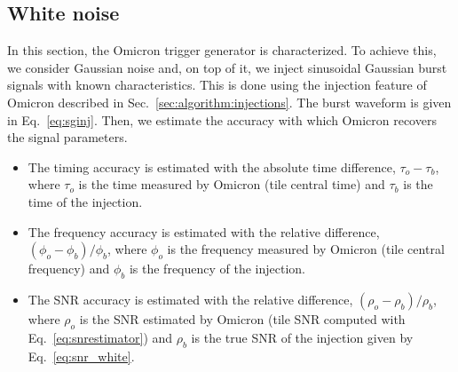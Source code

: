 \subsection{White noise} \label{sec:characterization:white}
In this section, the Omicron trigger generator is characterized. To achieve this, we consider Gaussian noise and, on top of it, we inject sinusoidal Gaussian burst signals with known characteristics. This is done using the injection feature of Omicron described in Sec.~\ref{sec:algorithm:injections}. The burst waveform is given in Eq.~\ref{eq:sginj}. Then, we estimate the accuracy with which Omicron recovers the signal parameters.
\begin{itemize}
\item The timing accuracy is estimated with the absolute time difference, $\tau_o-\tau_b$, where $\tau_o$ is the time measured by Omicron (tile central time) and $\tau_b$ is the time of the injection.
\item The frequency accuracy is estimated with the relative difference, $(\phi_o-\phi_b)/\phi_b$, where $\phi_o$ is the frequency measured by Omicron (tile central frequency) and $\phi_b$ is the frequency of the injection.
\item The SNR accuracy is estimated with the relative difference, $(\rho_o-\rho_b)/\rho_b$, where $\rho_o$ is the SNR estimated by Omicron (tile SNR computed with Eq.~\ref{eq:snrestimator}) and $\rho_b$ is the true SNR of the injection given by Eq.~\ref{eq:snr_white}.
\end{itemize}

